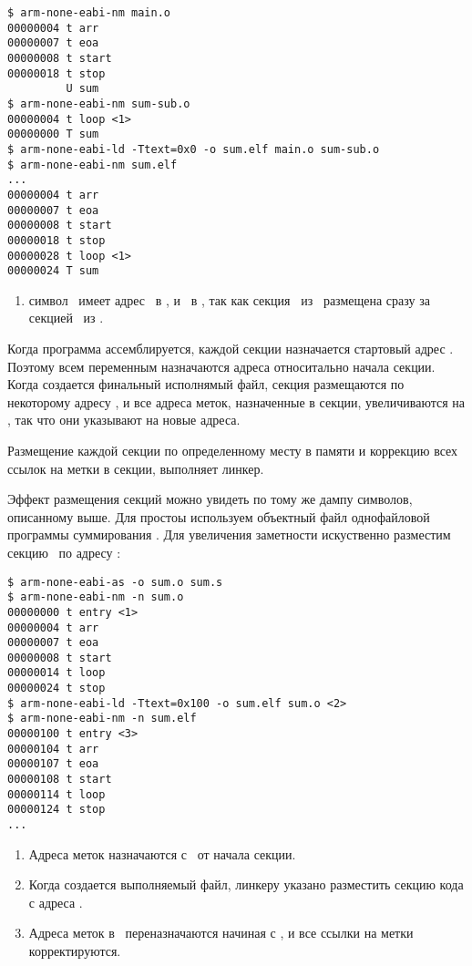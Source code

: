 \begin{verbatim}
$ arm-none-eabi-nm main.o
00000004 t arr
00000007 t eoa
00000008 t start
00000018 t stop
         U sum 
$ arm-none-eabi-nm sum-sub.o
00000004 t loop <1>
00000000 T sum
$ arm-none-eabi-ld -Ttext=0x0 -o sum.elf main.o sum-sub.o
$ arm-none-eabi-nm sum.elf
...
00000004 t arr
00000007 t eoa
00000008 t start
00000018 t stop
00000028 t loop <1>
00000024 T sum
\end{verbatim}
\begin{enumerate}
  \item символ \ имеет адрес \ в , и
  \ в , так как секция \ из
  \ размещена сразу за секцией \ из .
\end{enumerate}


Когда программа ассемблируется, каждой секции назначается стартовый адрес
. Поэтому всем переменным назначаются адреса относитально начала
секции. Когда создается финальный исполнямый файл, секция размещаются по
некоторому адресу , и все адреса меток, назначенные в секции,
увеличиваются на , так что они указывают на новые адреса.

Размещение каждой секции по определенному месту в памяти и коррекцию всех ссылок
на метки в секции, выполняет линкер.

Эффект размещения секций можно увидеть по тому же дампу символов, описанному
выше. Для простоы используем объектный файл однофайловой программы суммирования
. Для увеличения заметности искуственно разместим секцию
\ по адресу :

\begin{verbatim}
$ arm-none-eabi-as -o sum.o sum.s
$ arm-none-eabi-nm -n sum.o
00000000 t entry <1>
00000004 t arr
00000007 t eoa
00000008 t start
00000014 t loop
00000024 t stop
$ arm-none-eabi-ld -Ttext=0x100 -o sum.elf sum.o <2>
$ arm-none-eabi-nm -n sum.elf
00000100 t entry <3>
00000104 t arr
00000107 t eoa
00000108 t start
00000114 t loop
00000124 t stop
...
\end{verbatim}

\begin{enumerate}[nosep]
\item Адреса меток назначаются с \ от начала секции.
\item Когда создается выполняемый файл, линкеру указано разместить секцию кода с 
адреса .
\item Адреса меток в \ переназначаются начиная с , и
все ссылки на метки корректируются.
\end{enumerate}

